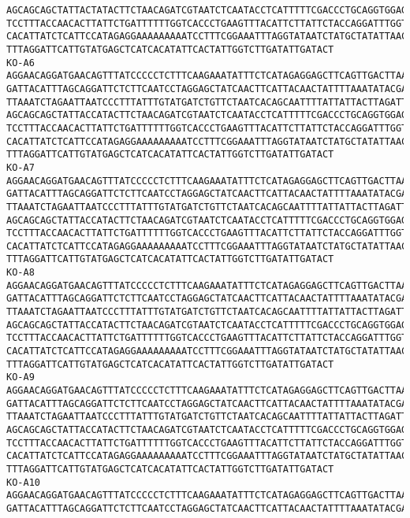 \documentclass[11pt]{article}
\begin{document}
\begin{Verbatim}[commandchars=\\\{\}]
AGCAGCAGCTATTACTATACTTCTAACAGATCGTAATCTCAATACCTCATTTTTCGACCCTGCAGGTGGAGGAGACCCAA
TCCTTTACCAACACTTATTCTGATTTTTTGGTCACCCTGAAGTTTACATTCTTATTCTACCAGGATTTGGTATTATTTCT
CACATTATCTCATTCCATAGAGGAAAAAAAAATCCTTTCGGAAATTTAGGTATAATCTATGCTATATTAACTATTGGAAT
TTTAGGATTCATTGTATGAGCTCATCACATATTCACTATTGGTCTTGATATTGATACT
KO-A6
AGGAACAGGATGAACAGTTTATCCCCCTCTTTCAAGAAATATTTCTCATAGAGGAGCTTCAGTTGACTTAAGAATCTTCA
GATTACATTTAGCAGGATTCTCTTCAATCCTAGGAGCTATCAACTTCATTACAACTATTTTAAATATACGACCAAAAAAC
TTAAATCTAGAATTAATCCCTTTATTTGTATGATCTGTTCTAATCACAGCAATTTTATTATTACTTAGATTACCAGTCTT
AGCAGCAGCTATTACCATACTTCTAACAGATCGTAATCTCAATACCTCATTTTTCGACCCTGCAGGTGGAGGAGACCCAA
TCCTTTACCAACACTTATTCTGATTTTTTGGTCACCCTGAAGTTTACATTCTTATTCTACCAGGATTTGGTATTATTTCT
CACATTATCTCATTCCATAGAGGAAAAAAAAATCCTTTCGGAAATTTAGGTATAATCTATGCTATATTAACTATTGGAAT
TTTAGGATTCATTGTATGAGCTCATCACATATTCACTATTGGTCTTGATATTGATACT
KO-A7
AGGAACAGGATGAACAGTTTATCCCCCTCTTTCAAGAAATATTTCTCATAGAGGAGCTTCAGTTGACTTAAGAATCTTCA
GATTACATTTAGCAGGATTCTCTTCAATCCTAGGAGCTATCAACTTCATTACAACTATTTTAAATATACGACCAAAAAAC
TTAAATCTAGAATTAATCCCTTTATTTGTATGATCTGTTCTAATCACAGCAATTTTATTATTACTTAGATTACCAGTCTT
AGCAGCAGCTATTACCATACTTCTAACAGATCGTAATCTCAATACCTCATTTTTCGACCCTGCAGGTGGAGGAGACCCAA
TCCTTTACCAACACTTATTCTGATTTTTTGGTCACCCTGAAGTTTACATTCTTATTCTACCAGGATTTGGTATTATTTCT
CACATTATCTCATTCCATAGAGGAAAAAAAAATCCTTTCGGAAATTTAGGTATAATCTATGCTATATTAACTATTGGAAT
TTTAGGATTCATTGTATGAGCTCATCACATATTCACTATTGGTCTTGATATTGATACT
KO-A8
AGGAACAGGATGAACAGTTTATCCCCCTCTTTCAAGAAATATTTCTCATAGAGGAGCTTCAGTTGACTTAAGAATCTTCA
GATTACATTTAGCAGGATTCTCTTCAATCCTAGGAGCTATCAACTTCATTACAACTATTTTAAATATACGACCAAAAAAC
TTAAATCTAGAATTAATCCCTTTATTTGTATGATCTGTTCTAATCACAGCAATTTTATTATTACTTAGATTACCAGTCTT
AGCAGCAGCTATTACCATACTTCTAACAGATCGTAATCTCAATACCTCATTTTTCGACCCTGCAGGTGGAGGAGACCCAA
TCCTTTACCAACACTTATTCTGATTTTTTGGTCACCCTGAAGTTTACATTCTTATTCTACCAGGATTTGGTATTATTTCT
CACATTATCTCATTCCATAGAGGAAAAAAAAATCCTTTCGGAAATTTAGGTATAATCTATGCTATATTAACTATTGGAAT
TTTAGGATTCATTGTATGAGCTCATCACATATTCACTATTGGTCTTGATATTGATACT
KO-A9
AGGAACAGGATGAACAGTTTATCCCCCTCTTTCAAGAAATATTTCTCATAGAGGAGCTTCAGTTGACTTAAGAATCTTCA
GATTACATTTAGCAGGATTCTCTTCAATCCTAGGAGCTATCAACTTCATTACAACTATTTTAAATATACGACCAAAAAAC
TTAAATCTAGAATTAATCCCTTTATTTGTATGATCTGTTCTAATCACAGCAATTTTATTATTACTTAGATTACCAGTCTT
AGCAGCAGCTATTACCATACTTCTAACAGATCGTAATCTCAATACCTCATTTTTCGACCCTGCAGGTGGAGGAGACCCAA
TCCTTTACCAACACTTATTCTGATTTTTTGGTCACCCTGAAGTTTACATTCTTATTCTACCAGGATTTGGTATTATTTCT
CACATTATCTCATTCCATAGAGGAAAAAAAAATCCTTTCGGAAATTTAGGTATAATCTATGCTATATTAACTATTGGAAT
TTTAGGATTCATTGTATGAGCTCATCACATATTCACTATTGGTCTTGATATTGATACT
KO-A10
AGGAACAGGATGAACAGTTTATCCCCCTCTTTCAAGAAATATTTCTCATAGAGGAGCTTCAGTTGACTTAAGAATCTTCA
GATTACATTTAGCAGGATTCTCTTCAATCCTAGGAGCTATCAACTTCATTACAACTATTTTAAATATACGACCAAAAAAC

\end{Verbatim}
\end{document}
